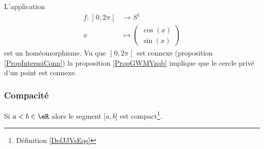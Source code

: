 \begin{example}
    L'application
    \begin{equation}
        \begin{aligned}
            f\colon \mathopen] 0 , 2\pi \mathclose[&\to S^1 \\
                x&\mapsto \begin{pmatrix}
                    \cos(x)    \\ 
                    \sin(x)    
                \end{pmatrix}
        \end{aligned}
    \end{equation}
    est un homéomorphisme. Vu que \( \mathopen] 0 , 2\pi \mathclose[\) est connexe (proposition \ref{PropInterssiConn}) la proposition \ref{PropGWMVzqb} implique que le cercle privé d'un point est connexe.
\end{example}

\subsubsection{Compacité}

\begin{lemma}\label{LemOACGWxV}
    Si \( a<b\in \eR\) alors le segment \( \mathopen[ a , b \mathclose]\) est compact\footnote{Définition \ref{DefJJVsEqs}}.
\end{lemma}


